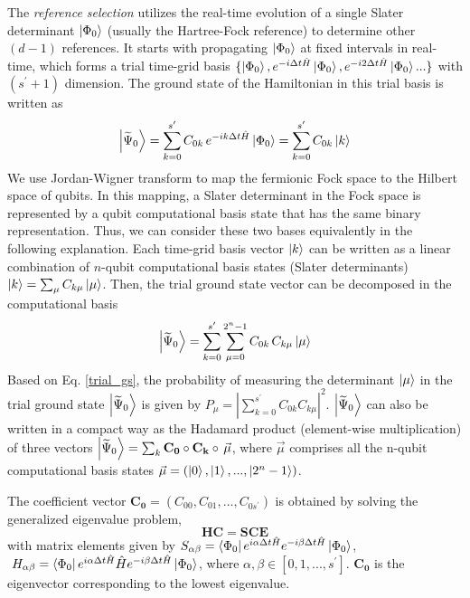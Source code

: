 \documentclass[journal=jctcce,manuscript=article]{achemso}
\begin{document}
The \textit{reference selection} utilizes the real-time evolution of a single Slater determinant $\left\vert{\Phi_0}\right\rangle$ (usually the Hartree-Fock reference) to determine other $(d-1)$ references.
It starts with propagating $\left\vert{\Phi_0}\right\rangle$ at fixed intervals in real-time, which forms a trial time-grid basis $\{\left\vert{\Phi_0}\right\rangle, e^{-i\Delta t \hat{H}} \left\vert{\Phi_0}\right\rangle, e^{-i2\Delta t \hat{H}} \left\vert{\Phi_0}\right\rangle...\}$ with $(s^{\prime}+1)$ dimension.
The ground state of the Hamiltonian in this trial basis is written as
\begin{equation}
\left\vert{\widetilde{\Psi}_{0}}\right\rangle = \sum_{k=0}^{s^{\prime}} C_{0 k} \, e^{-i k \Delta t \hat{H}} \left\vert{\Phi_{0}}\right\rangle
= \sum_{k=0}^{s^{\prime}} C_{0 k}  \left\vert{k}\right\rangle
\end{equation}
We use Jordan-Wigner transform\cite{jordan1993paulische} to map the fermionic Fock space to the Hilbert space of qubits.\cite{whitfield2011simulation} In this mapping, a Slater determinant in the Fock space is represented by a qubit computational basis state that has the same binary representation. Thus, we can consider these two bases equivalently in the following explanation. 
Each time-grid basis vector $\left\vert{k}\right\rangle$ can be written as a linear combination of $n$-qubit computational basis states (Slater determinants) $\left\vert{k}\right\rangle = \sum_{\mu} C_{k \mu} \left\vert{\mu}\right\rangle$. Then, the trial ground state vector can be decomposed in the computational basis
\begin{equation}
\label{trial_gs}
\left\vert{\widetilde{\Psi}_{0}}\right\rangle = \sum_{k=0}^{s^{\prime}} \sum_{\mu=0}^{2^{n}-1}  C_{0 k} \, C_{k \mu} \left\vert{\mu}\right\rangle 
\end{equation}
Based on Eq. \ref{trial_gs}, the probability of measuring the determinant $\left\vert{\mu}\right\rangle$ in the trial ground state $\left\vert{\widetilde{\Psi}_{0}}\right\rangle$ is given by $P_{\mu}=|\sum_{k=0}^{s^{\prime}} C_{0 k} C_{k \mu}|^{2}$.
$\left\vert{\widetilde{\Psi}_{0}}\right\rangle$ can also be written in a compact way as the Hadamard product\cite{horn2012matrix} (element-wise multiplication) of three vectors $\left\vert{\widetilde{\Psi}_{0}}\right\rangle = \sum_{k} \mathbf{C_{0}}  \circ  \mathbf{C_{k }}   \circ \,  \vec{\mu}$,
where $\vec{\mu}$ comprises all the n-qubit computational basis states $\vec{\mu} = (\left\vert{0}\right\rangle, \left\vert{1}\right\rangle, ... ,\left\vert{2^{n}-1}\right\rangle)$.


The coefficient vector $\mathbf{C_{0}} = (C_{00}, C_{01}, ... , C_{0s^{\prime}} )$ is obtained by solving the generalized eigenvalue problem,
\begin{equation}
\label{ge}
\mathbf{HC} = \mathbf{SCE}
\end{equation}
with matrix elements given by 
$S_{\alpha \beta} = \left\langle{\Phi_0}\right\vert e^{i \alpha \Delta t \hat{H}} e^{-i \beta \Delta t \hat{H}} \left\vert{\Phi_0}\right\rangle $,
$\ H_{\alpha \beta} = \left\langle{\Phi_0}\right\vert e^{i \alpha \Delta t \hat{H}}  \hat{H}   e^{-i \beta \Delta t \hat{H}}  \left\vert{\Phi_0}\right\rangle$,
where $\alpha, \beta \in [0,1,...,s^{\prime}]$. $\mathbf{C_{0}}$ is the eigenvector corresponding to the lowest eigenvalue.
\end{document}
